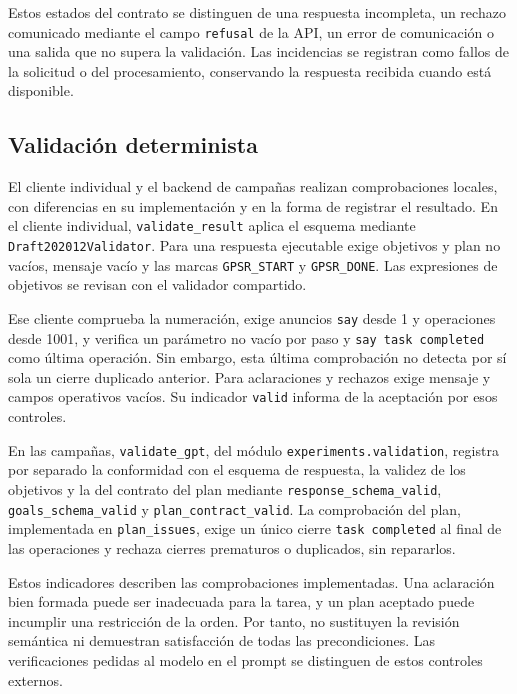 Estos estados del contrato se distinguen de una respuesta incompleta,
un rechazo comunicado mediante el campo \texttt{refusal} de la API,
un error de comunicación o una salida que no supera la validación.
Las incidencias se registran como fallos de la solicitud o del
procesamiento, conservando la respuesta recibida cuando está disponible.

\subsection{Validación determinista}

El cliente individual y el backend de campañas realizan comprobaciones
locales, con diferencias en su implementación y en la forma de registrar
el resultado. En el cliente individual, \texttt{validate\_\allowbreak result}
aplica el esquema mediante \texttt{Draft202012Validator}. Para una
respuesta ejecutable exige objetivos y plan no vacíos, mensaje vacío y
las marcas \texttt{GPSR\_START} y \texttt{GPSR\_DONE}. Las expresiones
de objetivos se revisan con el validador compartido.

Ese cliente comprueba la numeración, exige anuncios \texttt{say} desde 1
y operaciones desde 1001, y verifica un parámetro no vacío por paso y
\texttt{say task completed} como última operación. Sin embargo, esta
última comprobación no detecta por sí sola un cierre duplicado anterior.
Para aclaraciones y rechazos exige mensaje y campos operativos vacíos.
Su indicador \texttt{valid} informa de la aceptación por esos controles.

En las campañas, \texttt{validate\_gpt}, del módulo
\texttt{experiments.\allowbreak validation}, registra por separado la conformidad
con el esquema de respuesta, la validez de los objetivos y la del contrato
del plan mediante \texttt{response\_\allowbreak schema\_\allowbreak valid},
\texttt{goals\_\allowbreak schema\_\allowbreak valid} y \texttt{plan\_\allowbreak contract\_\allowbreak valid}.
La comprobación del plan, implementada en \texttt{plan\_issues}, exige
un único cierre \texttt{task completed} al final de las operaciones y
rechaza cierres prematuros o duplicados, sin repararlos.

Estos indicadores describen las comprobaciones implementadas. Una
aclaración bien formada puede ser inadecuada para la tarea, y un plan
aceptado puede incumplir una restricción de la orden. Por tanto, no
sustituyen la revisión semántica ni demuestran satisfacción de todas
las precondiciones. Las verificaciones pedidas al modelo en el prompt
se distinguen de estos controles externos.

